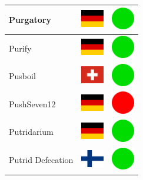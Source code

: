 \documentclass[12pt, a4paper, twoside]{report}
\begin{document}
\begin{center}
\begin{longtable}{|p{5cm}|p{2cm}|p{2cm}|}
 Purgatory                                                  & \includegraphics[width=1cm]{../4x3/de} &   \includegraphics[width=1cm]{../likes/y} \\ \hline
 Purify                                                     & \includegraphics[width=1cm]{../4x3/de} &   \includegraphics[width=1cm]{../likes/y} \\ \hline
 Pusboil                                                    & \includegraphics[width=1cm]{../4x3/ch} &   \includegraphics[width=1cm]{../likes/y} \\ \hline
 PushSeven12                                                & \includegraphics[width=1cm]{../4x3/de} &   \includegraphics[width=1cm]{../likes/n} \\ \hline
 Putridarium                                                & \includegraphics[width=1cm]{../4x3/de} &   \includegraphics[width=1cm]{../likes/y} \\ \hline
 Putrid Defecation                                          & \includegraphics[width=1cm]{../4x3/fi} &   \includegraphics[width=1cm]{../likes/y} \\ \hline

\end{longtable}
\end{center}
\end{document}
